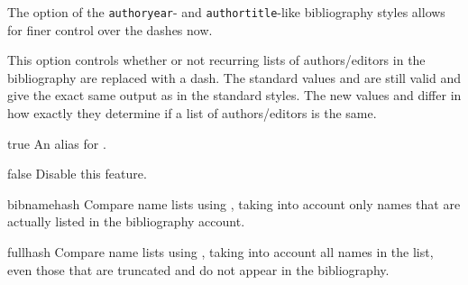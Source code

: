 \documentclass[DIV=9]{scrartcl}
\def\sty{\texttt}
\begin{document}
\begin{optionlist}
\nocite{westfahl:frontier}


The  option of the \sty{authoryear}- and \sty{authortitle}-like
bibliography styles allows for finer control over the dashes now.

This option controls whether or not recurring lists of authors/editors in the
bibliography are replaced with a dash.
The standard values  and  are still valid and give the
exact same output as in the standard styles.
The new values  and  differ in how exactly they
determine if a list of authors/editors is the same.
\begin{valuelist}
\item[true] An alias for .
\item[false] Disable this feature.
\item[bibnamehash] Compare name lists using , taking
                   into account only names that are actually listed in the
                   bibliography account.
\item[fullhash] Compare name lists using , taking into
                account all names in the list, even those that are truncated
                and do not appear in the bibliography.
\end{valuelist}



\end{optionlist}
\end{document}
